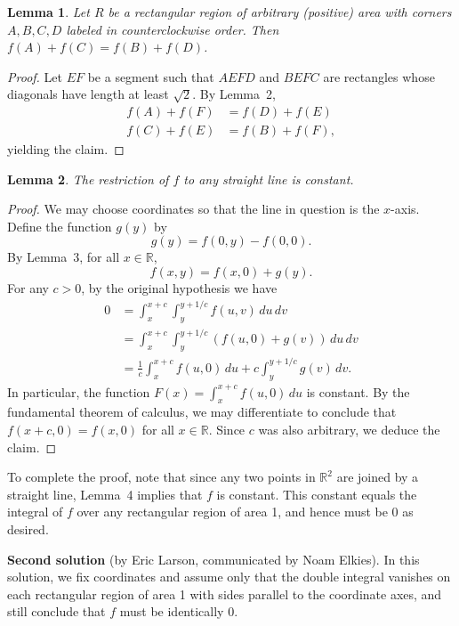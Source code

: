 \documentclass[amssymb,twocolumn,pra,10pt,aps]{revtex4-1}
\newtheorem{lemma}{Lemma}
\newcommand{\RR}{\mathbb{R}}
\begin{document}
\begin{itemize}
\begin{lemma}
Let $R$ be a rectangular region of arbitrary (positive) area with corners $A,B,C,D$ labeled in counterclockwise order. Then
$f(A) + f(C) = f(B) + f(D)$.
\end{lemma}
\begin{proof}
Let $EF$ be a segment such that $AEFD$ and $BEFC$ are rectangles whose diagonals have length at least $\sqrt{2}$. By Lemma~2,
\begin{align*}
f(A) + f(F) &= f(D) + f(E) \\
f(C) + f(E) &= f(B) + f(F),
\end{align*}
yielding the claim.
\end{proof}

\begin{lemma}
The restriction of $f$ to any straight line is constant.
\end{lemma}
\begin{proof}
We may choose coordinates so that the line in question is the $x$-axis.
Define the function $g(y)$ by
\[
g(y) = f(0,y) - f(0,0).
\]
By Lemma~3, for all $x \in \RR$,
\[
f(x,y) = f(x,0) + g(y).
\]
For any $c>0$, by the original hypothesis we have
\begin{align*}
0 &= \int_x^{x+c} \int_y^{y+1/c} f(u,v)\,du\,dv \\
&= \int_x^{x+c} \int_y^{y+1/c} (f(u,0) + g(v))\,du\,dv \\
&= \frac{1}{c} \int_x^{x+c} f(u,0)\,du + c \int_y^{y+1/c} g(v)\,dv.
\end{align*}
In particular, the function $F(x) = \int_x^{x+c} f(u,0)\,du$ is constant.
By the fundamental theorem of calculus, we may differentiate to conclude that
$f(x+c,0) = f(x,0)$ for all $x \in \RR$. Since $c$ was also arbitrary, we deduce the claim.
\end{proof}

To complete the proof, note that
since any two points in $\RR^2$ are joined by a straight line, Lemma~4 implies that $f$ is constant.
This constant equals the integral of $f$ over any rectangular region of area 1, and hence must be 0
as desired.

\noindent
\textbf{Second solution} (by Eric Larson, communicated by Noam Elkies).
In this solution, we fix coordinates and
assume only that the double integral vanishes on each rectangular region of area 1
with sides parallel to the coordinate axes, and still conclude that $f$ must be identically 0.


\end{itemize}
\end{document}
